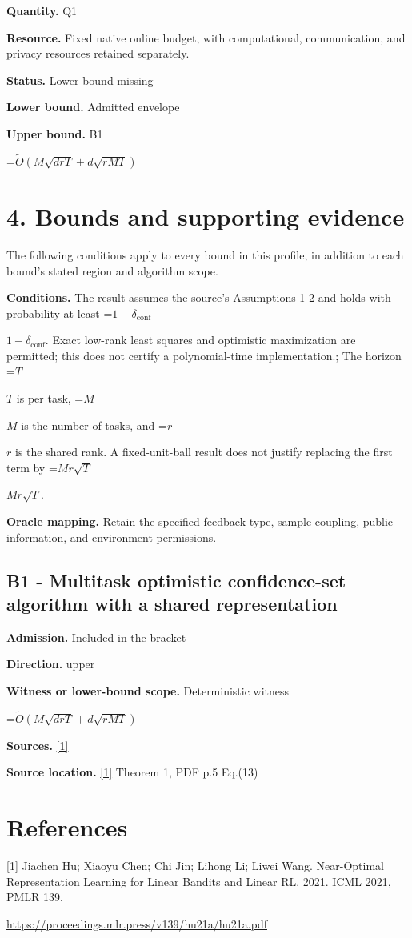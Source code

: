 \documentclass[10pt,a4paper]{article}
\newcommand{\AtlasMath}[1]{\par\begingroup\centering\setbox0=\hbox{$\displaystyle #1$}\ifdim\wd0>1.4\linewidth\typeout{ATLAS WIDE FORMULA: \the\wd0}\fi\ifdim\wd0>\linewidth\resizebox{\linewidth}{!}{\box0}\else\box0\fi\par\endgroup}
\newcommand{\AtlasInlineMath}[1]{\begingroup\setbox0=\hbox{$#1$}\ifdim\wd0>.4\linewidth\endgroup\AtlasMath{#1}\else\endgroup$#1$\fi}
\begin{document}
\textbf{Quantity.} Q1

\textbf{Resource.} Fixed native online budget, with computational, communication, and privacy resources retained separately.

\textbf{Status.} Lower bound missing

\textbf{Lower bound.} Admitted envelope

\textbf{Upper bound.} B1

\AtlasMath{\widetilde{O}\!\left(M\sqrt{drT}+d\sqrt{rMT}\right)}
\section{4. Bounds and supporting evidence}
The following conditions apply to every bound in this profile, in addition to each bound's stated region and algorithm scope.

\textbf{Conditions.} The result assumes the source's Assumptions 1-2 and holds with probability at least \AtlasInlineMath{1-\delta_{\mathrm{conf}}}. Exact low-rank least squares and optimistic maximization are permitted; this does not certify a polynomial-time implementation.; The horizon \AtlasInlineMath{T} is per task, \AtlasInlineMath{M} is the number of tasks, and \AtlasInlineMath{r} is the shared rank. A fixed-unit-ball result does not justify replacing the first term by \AtlasInlineMath{Mr\sqrt T}.

\textbf{Oracle mapping.} Retain the specified feedback type, sample coupling, public information, and environment permissions.

\subsection{B1 - Multitask optimistic confidence-set algorithm with a shared representation}
\textbf{Admission.} Included in the bracket

\textbf{Direction.} upper

\textbf{Witness or lower-bound scope.} Deterministic witness

\AtlasMath{\widetilde{O}\!\left(M\sqrt{drT}+d\sqrt{rMT}\right)}
\textbf{Sources.} \href{https://proceedings.mlr.press/v139/hu21a/hu21a.pdf}{[1]}

\textbf{Source location.} \href{https://proceedings.mlr.press/v139/hu21a/hu21a.pdf}{[1]} Theorem 1, PDF p.5 Eq.(13)

\section{References}
[1] Jiachen Hu; Xiaoyu Chen; Chi Jin; Lihong Li; Liwei Wang. Near-Optimal Representation Learning for Linear Bandits and Linear RL. 2021. ICML 2021, PMLR 139.

\url{https://proceedings.mlr.press/v139/hu21a/hu21a.pdf}
\end{document}
